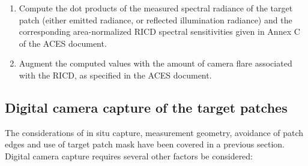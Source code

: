 \begin{enumerate}
	\item Compute the dot products of the measured spectral radiance of the target patch (either emitted radiance, or reflected illumination radiance) and the corresponding area-normalized RICD spectral sensitivities given in Annex C of the ACES document.
	\item Augment the computed values with the amount of camera flare associated with the RICD, as specified in the ACES document.
\end{enumerate}


\subsection*{Digital camera capture of the target patches}
The considerations of in situ capture, measurement geometry, avoidance of patch edges and use of target patch mask have been covered in a previous section. Digital camera capture requires several other factors be considered:

